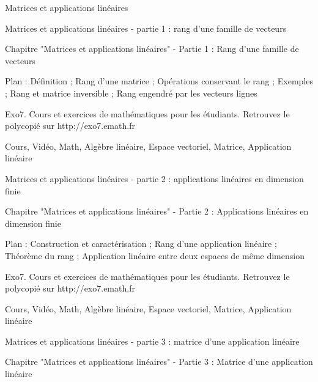 
   Matrices et applications linéaires




Matrices et applications linéaires - partie 1 : rang d'une famille de vecteurs



Chapitre "Matrices et applications linéaires" - Partie 1 : Rang d'une famille de vecteurs

Plan : Définition ; Rang d'une matrice ; Opérations conservant le rang ;
Exemples ; Rang et matrice inversible ; Rang engendré par les vecteurs lignes

Exo7. Cours et exercices de mathématiques pour les étudiants.
Retrouvez le polycopié sur http://exo7.emath.fr


Cours, Vidéo, Math, Algèbre linéaire, Espace vectoriel, Matrice, Application linéaire





Matrices et applications linéaires - partie 2 : applications linéaires en dimension finie



Chapitre "Matrices et applications linéaires" - Partie 2 : Applications linéaires en dimension finie

Plan : Construction et caractérisation ; Rang d'une application linéaire ; 
Théorème du rang ; Application linéaire entre deux espaces de même dimension

Exo7. Cours et exercices de mathématiques pour les étudiants.
Retrouvez le polycopié sur http://exo7.emath.fr


Cours, Vidéo, Math, Algèbre linéaire, Espace vectoriel, Matrice, Application linéaire





Matrices et applications linéaires - partie 3 : matrice d'une application linéaire



Chapitre "Matrices et applications linéaires" - Partie 3 : Matrice d'une application linéaire

